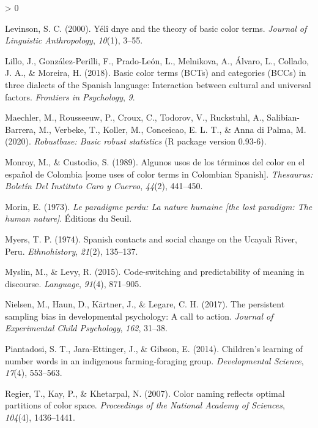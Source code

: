 \documentclass[
  english,
  ,apa7,floatsintext]{apa6}
\newlength{\cslhangindent}
\newenvironment{CSLReferences}[2] %
 {%
  \setlength{\parindent}{0pt}
  \ifodd #1 \everypar{\setlength{\hangindent}{\cslhangindent}}\ignorespaces\fi
  \ifnum #2 > 0
  \setlength{\parskip}{#2\baselineskip}
  \fi
 }%
 {}
\begin{document}
\begin{CSLReferences}{1}{0}
\leavevmode\hypertarget{ref-levinson2000}{}%
Levinson, S. C. (2000). Yélî dnye and the theory of basic color terms. \emph{Journal of Linguistic Anthropology}, \emph{10}(1), 3--55.

\leavevmode\hypertarget{ref-lillo2018}{}%
Lillo, J., González-Perilli, F., Prado-León, L., Melnikova, A., Álvaro, L., Collado, J. A., \& Moreira, H. (2018). Basic color terms (BCTs) and categories (BCCs) in three dialects of the {S}panish language: Interaction between cultural and universal factors. \emph{Frontiers in Psychology}, \emph{9}.

\leavevmode\hypertarget{ref-R-robustbase}{}%
Maechler, M., Rousseeuw, P., Croux, C., Todorov, V., Ruckstuhl, A., Salibian-Barrera, M., Verbeke, T., Koller, M., Conceicao, E. L. T., \& Anna di Palma, M. (2020). \emph{Robustbase: Basic robust statistics} (R package version 0.93-6).

\leavevmode\hypertarget{ref-monroy1989}{}%
Monroy, M., \& Custodio, S. (1989). Algunos usos de los t{é}rminos del color en el espa{ñ}ol de {C}olombia {[}some uses of color terms in {C}olombian {S}panish{]}. \emph{Thesaurus: Bolet{í}n Del Instituto Caro y Cuervo}, \emph{44}(2), 441--450.

\leavevmode\hypertarget{ref-morin1973}{}%
Morin, E. (1973). \emph{Le paradigme perdu: La nature humaine {[}the lost paradigm: The human nature{]}}. {É}ditions du Seuil.

\leavevmode\hypertarget{ref-Myers1974}{}%
Myers, T. P. (1974). {S}panish contacts and social change on the {U}cayali {R}iver, {P}eru. \emph{Ethnohistory}, \emph{21}(2), 135--137.

\leavevmode\hypertarget{ref-myslin2015}{}%
Myslin, M., \& Levy, R. (2015). Code-switching and predictability of meaning in discourse. \emph{Language}, \emph{91}(4), 871--905.

\leavevmode\hypertarget{ref-nielson2017}{}%
Nielsen, M., Haun, D., Kärtner, J., \& Legare, C. H. (2017). The persistent sampling bias in developmental psychology: A call to action. \emph{Journal of Experimental Child Psychology}, \emph{162}, 31--38.

\leavevmode\hypertarget{ref-piantadosi2014}{}%
Piantadosi, S. T., Jara‐Ettinger, J., \& Gibson, E. (2014). Children's learning of number words in an indigenous farming‐foraging group. \emph{Developmental Science}, \emph{17}(4), 553--563.

\leavevmode\hypertarget{ref-regier2007}{}%
Regier, T., Kay, P., \& Khetarpal, N. (2007). Color naming reflects optimal partitions of color space. \emph{Proceedings of the National Academy of Sciences}, \emph{104}(4), 1436--1441.


\end{CSLReferences}
\end{document}
